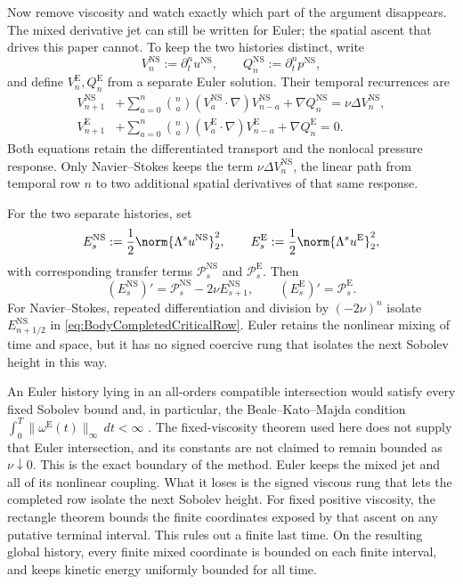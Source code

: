 Now remove viscosity and watch exactly which part of the argument disappears.  The
mixed derivative jet can still be written for Euler; the spatial ascent that drives
this paper cannot.
To keep the two histories distinct, write
\[
  V_n^{\mathrm{NS}}:=\partial_t^nu^{\mathrm{NS}},
  \qquad
  Q_n^{\mathrm{NS}}:=\partial_t^np^{\mathrm{NS}},
\]
and define \(V_n^{\mathrm E},Q_n^{\mathrm E}\) from a separate Euler solution.
Their temporal recurrences are
\begin{align}
  V_{n+1}^{\mathrm{NS}}
  &+
  \sum_{a=0}^{n}\binom{n}{a}
  (V_a^{\mathrm{NS}}\cdot\nabla)V_{n-a}^{\mathrm{NS}}
  +\nabla Q_n^{\mathrm{NS}}
  =\nu\Delta V_n^{\mathrm{NS}},
  \label{eq:NSTemporalRecurrenceComparison}
  \\
  V_{n+1}^{\mathrm E}
  &+
  \sum_{a=0}^{n}\binom{n}{a}
  (V_a^{\mathrm E}\cdot\nabla)V_{n-a}^{\mathrm E}
  +\nabla Q_n^{\mathrm E}
  =0.
  \label{eq:EulerTemporalRecurrenceComparison}
\end{align}
Both equations retain the differentiated transport and the nonlocal pressure response.
Only Navier--Stokes keeps the term \(\nu\Delta V_n^{\mathrm{NS}}\), the linear path
from temporal row \(n\) to two additional spatial derivatives of that same response.

For the two separate histories, set
\[
  E_s^{\mathrm{NS}}:=\frac12\norm{\Lambda^su^{\mathrm{NS}}}_2^2,
  \qquad
  E_s^{\mathrm E}:=\frac12\norm{\Lambda^su^{\mathrm E}}_2^2,
\]
with corresponding transfer terms \(\mathcal P_s^{\mathrm{NS}}\) and \(\mathcal P_s^{\mathrm E}\).
Then
\begin{equation}\label{eq:NSEulerEnergyComparison}
  (E_s^{\mathrm{NS}})'
  =\mathcal P_s^{\mathrm{NS}}-2\nu E_{s+1}^{\mathrm{NS}},
  \qquad
  (E_s^{\mathrm E})'
  =\mathcal P_s^{\mathrm E}.
\end{equation}
For Navier--Stokes, repeated differentiation and division by \((-2\nu)^n\) isolate \(E_{n+1/2}^{\mathrm{NS}}\) in \eqref{eq:BodyCompletedCriticalRow}.
Euler retains the nonlinear mixing of time and space, but it has no signed coercive rung that isolates the next Sobolev height in this way.

An Euler history lying in an all-orders compatible intersection would satisfy every
fixed Sobolev bound and, in particular, the Beale--Kato--Majda condition
\(\int_0^T\|\omega^{\mathrm E}(t)\|_\infty\,dt<\infty\)
\parencite{BealeKatoMajda1984}.
The fixed-viscosity theorem used here does not supply that Euler intersection, and its constants are not claimed to remain bounded as \(\nu\downarrow0\).
This is the exact boundary of the method.  Euler keeps the mixed jet and all of its
nonlinear coupling.  What it loses is the signed viscous rung that lets the completed
row isolate the next Sobolev height.
For fixed positive viscosity, the rectangle theorem bounds the finite coordinates exposed by that ascent on any putative terminal interval.
This rules out a finite last time.
On the resulting global history, every finite mixed coordinate is bounded on each finite interval, and  keeps kinetic energy uniformly bounded for all time.
